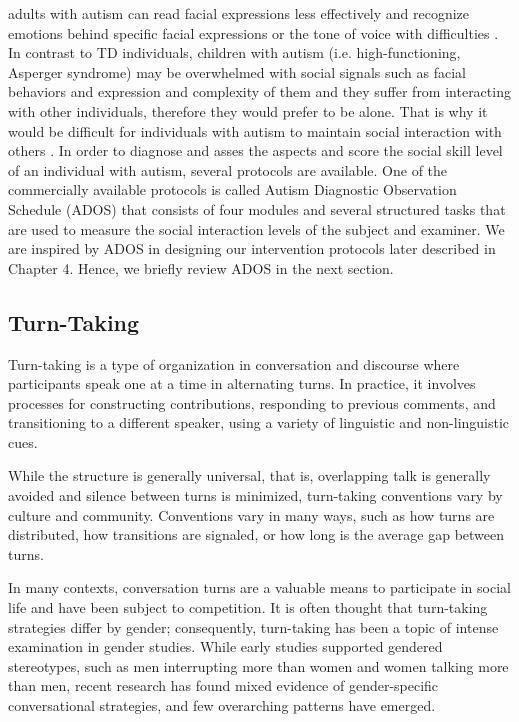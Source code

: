 adults with autism can read facial expressions less effectively and recognize emotions
behind specific facial expressions or the tone of voice with difficulties \cite{LogicScien1959}. In contrast to
TD individuals, children with autism (i.e. high-functioning, Asperger syndrome) may be
overwhelmed with social signals such as facial behaviors and expression and complexity
of them and they suffer from interacting with other individuals, therefore they would prefer
to be alone. That is why it would be difficult for individuals with autism to maintain social
interaction with others \cite{InfantileAutism1975}.
In order to diagnose and asses the aspects and score the social skill level of an individual
with autism, several protocols are available. One of the commercially available protocols
is called Autism Diagnostic Observation Schedule (ADOS) \cite{AutismDiagno1989} that consists of four
modules and several structured tasks that are used to measure the social interaction levels
of the subject and examiner. We are inspired by ADOS in designing our intervention
protocols later described in Chapter 4. Hence, we briefly review ADOS in the next section.

\subsection{Turn-Taking}
Turn-taking is a type of organization in conversation and discourse where participants speak 
one at a time in alternating turns. In practice, it involves processes for constructing 
contributions, responding to previous comments, and transitioning to a different speaker, 
using a variety of linguistic and non-linguistic cues.\cite{BehaviorlaStudy1964}

While the structure is generally universal,\cite{RoboticMovement} that is, overlapping talk is generally 
avoided and silence between turns is minimized, turn-taking conventions vary by culture 
and community.\cite{EnhanceEmpiri2011} Conventions vary in many ways, such as how turns are distributed, how 
transitions are signaled, or how long is the average gap between turns.

In many contexts, conversation turns are a valuable means to participate in social life 
and have been subject to competition.\cite{DOMER2011} It is often thought that turn-taking strategies 
differ by gender; consequently, turn-taking has been a topic of intense examination in 
gender studies. While early studies supported gendered stereotypes, such as men interrupting
more than women and women talking more than men,\cite{DefineSocial2005} recent research has found mixed evidence 
of gender-specific conversational strategies, and few overarching patterns have emerged.\cite{SocialInteract2003}

